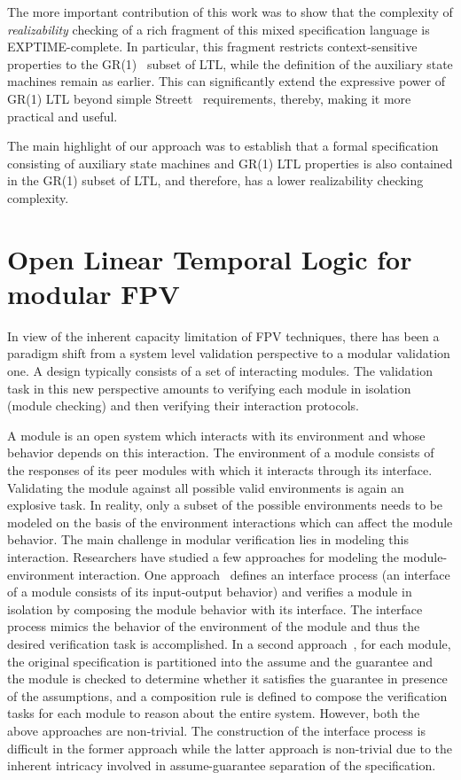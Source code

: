 \documentclass[a4paper, 11pt]{article}
\begin{document}
The more important contribution of this work was to show that 
the complexity of {\em realizability} checking of 
a rich fragment of this mixed specification language is EXPTIME-complete. 
In particular, this fragment restricts context-sensitive properties 
to the GR(1)~\cite{nir} subset of LTL, while the definition 
of the auxiliary state machines remain as earlier. 
This can significantly extend the expressive power of GR(1) LTL beyond simple
Streett~\cite{nir} requirements, thereby, making it more practical and useful.

The main highlight of our approach was to establish that a
formal specification consisting of auxiliary state machines and
GR(1) LTL properties is also contained in the GR(1) subset of LTL, and
therefore, has a lower realizability checking complexity.

\section{Open Linear Temporal Logic for modular FPV} \label{sec6}
In view of the inherent capacity limitation of FPV techniques, there has 
been a paradigm shift from a system level validation perspective to a 
modular validation one. A design typically consists of a set of interacting 
modules. The validation
task in this new perspective amounts to verifying each module in
isolation (module checking) and then verifying their interaction protocols.

A module is an open system which interacts with its environment
and whose behavior depends on this interaction. The environment of a module
consists of the responses of its peer modules with which it interacts through
its interface. Validating the module against all possible valid environments
is again an explosive task. In reality, only a subset of the possible
environments needs to be modeled on the basis of the environment interactions
which can affect the module behavior. The main challenge in modular 
verification lies in modeling this interaction. 
Researchers have studied a few approaches for modeling the 
module-environment interaction. One approach~\cite{alfaro} defines 
an interface
process (an interface of a module consists of its input-output behavior)
and verifies a module in isolation by composing the module
behavior with its interface. The interface process mimics the behavior of the
environment of the module and thus the desired verification task is
accomplished. In a second approach~\cite{josko1}, for each module, the original
specification is partitioned into the assume and the guarantee
and the module is checked to determine whether it satisfies the guarantee
in presence of the assumptions, and a composition rule is defined to compose
the verification tasks for each module to reason about the entire system.
However, both the above approaches are non-trivial. The
construction of the interface process is difficult in the former approach while
the latter approach is non-trivial due to the inherent intricacy involved
in assume-guarantee separation of the specification.
\end{document}
